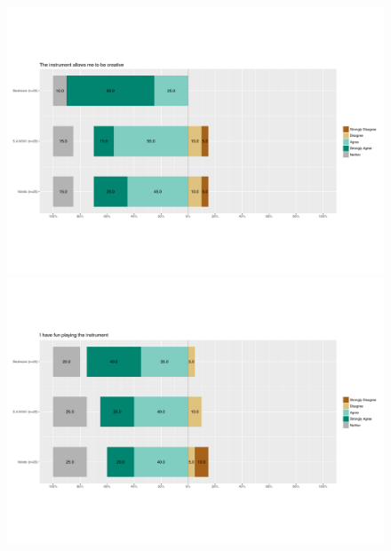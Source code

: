 \bigskip
\begin{figure}
\begin{minipage}[b]{0.5\textwidth}
\includegraphics[width=\linewidth]{figs/Q1.pdf}
\end{minipage}
\begin{minipage}[b]{0.5\textwidth}
\includegraphics[width=\linewidth]{figs/Q4.pdf}
\end{minipage}



\end{figure}

